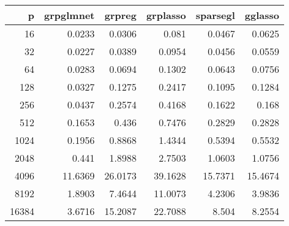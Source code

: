 \begin{tabular}{rrrrrr}
\hline
     p &   grpglmnet &   grpreg &   grplasso &   sparsegl &   gglasso \\
\hline
    16 &      0.0233 &   0.0306 &     0.081  &     0.0467 &    0.0625 \\
    32 &      0.0227 &   0.0389 &     0.0954 &     0.0456 &    0.0559 \\
    64 &      0.0283 &   0.0694 &     0.1302 &     0.0643 &    0.0756 \\
   128 &      0.0327 &   0.1275 &     0.2417 &     0.1095 &    0.1284 \\
   256 &      0.0437 &   0.2574 &     0.4168 &     0.1622 &    0.168  \\
   512 &      0.1653 &   0.436  &     0.7476 &     0.2829 &    0.2828 \\
  1024 &      0.1956 &   0.8868 &     1.4344 &     0.5394 &    0.5532 \\
  2048 &      0.441  &   1.8988 &     2.7503 &     1.0603 &    1.0756 \\
  4096 &     11.6369 &  26.0173 &    39.1628 &    15.7371 &   15.4674 \\
  8192 &      1.8903 &   7.4644 &    11.0073 &     4.2306 &    3.9836 \\
 16384 &      3.6716 &  15.2087 &    22.7088 &     8.504  &    8.2554 \\
\hline
\end{tabular}